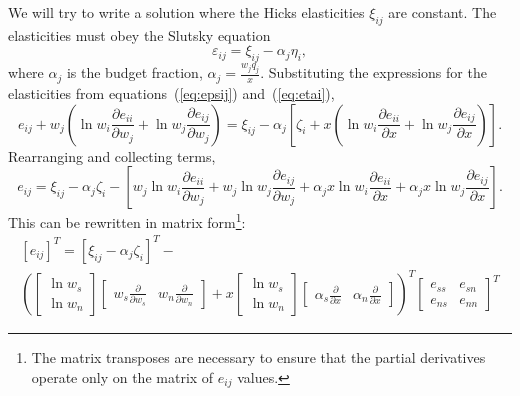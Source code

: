 \documentclass[11pt]{article}
\begin{document}
We will try to write a solution where the Hicks elasticities
$\xi_{ij}$ are constant.  The elasticities must obey the Slutsky
equation
\begin{equation}
  \varepsilon_{ij} = \xi_{ij} - \alpha_j \eta_i,
\end{equation}
where $\alpha_j$ is the budget fraction, $\alpha_j = \frac{w_j
  q_j}{x}$.  Substituting the expressions for the elasticities from
equations~(\ref{eq:epsij}) and~(\ref{eq:etai}),
\begin{equation}
  e_{ij} + w_j\left(\ln w_i \frac{\partial e_{ii}}{\partial w_j} + \ln
  w_j \frac{\partial e_{ij}}{\partial w_j}\right) =
  \xi_{ij} - \alpha_j \left[\zeta_i + x\left(\ln
  w_i \frac{\partial e_{ii}}{\partial x} + \ln w_j \frac{\partial
    e_{ij}}{\partial x}\right)\right].
\end{equation}
Rearranging and collecting terms,
\begin{equation}
  \label{eq:PDE}
e_{ij} = \xi_{ij} - \alpha_j\zeta_i - \left[w_j \ln w_i \frac{\partial
    e_{ii}}{\partial w_j} + w_j \ln w_j \frac{\partial
    e_{ij}}{\partial w_j} + \alpha_j x \ln w_i \frac{\partial
    e_{ii}}{\partial x} + \alpha_j x \ln w_j \frac{\partial
    e_{ij}}{\partial x}\right].
\end{equation}
This can be rewritten in matrix form\footnote{The matrix transposes
  are necessary to ensure that the partial derivatives operate only on
  the matrix of $e_{ij}$ values.}:
\begin{multline}
  \label{eq:PDEmat}
  \left[e_{ij}\right]^T = \left[\xi_{ij}-\alpha_j\zeta_i\right]^T - \\
  \left(
  \begin{bmatrix}
    \ln w_s \\
    \ln w_n
  \end{bmatrix}
  \begin{bmatrix}
    w_s \frac{\partial}{\partial w_s} & w_n \frac{\partial}{\partial w_n}
  \end{bmatrix} 
  + x
  \begin{bmatrix}
    \ln w_s \\
    \ln w_n
  \end{bmatrix}
  \begin{bmatrix}
    \alpha_s \frac{\partial}{\partial x} & \alpha_n
    \frac{\partial}{\partial x}
  \end{bmatrix}
  \right)^T
  \begin{bmatrix}
    e_{ss} & e_{sn} \\
    e_{ns} & e_{nn}
  \end{bmatrix}^T
\end{multline}
\end{document}
